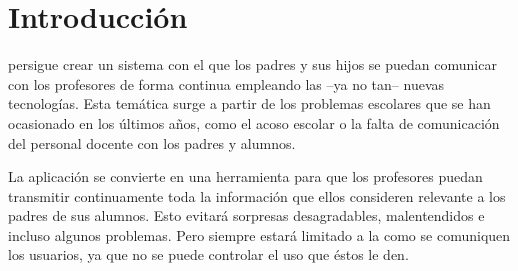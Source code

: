 %
%
%
%

\cleardoublepage
\chapter{Introducción}
\label{chap:intorduction}

\CollegeApp persigue crear un sistema con el que los padres y sus hijos se puedan comunicar con los profesores de forma continua empleando las --ya no tan-- nuevas tecnologías. Esta temática surge a partir de los problemas escolares que se han ocasionado en los últimos años, como el acoso escolar o la falta de comunicación del personal docente con los padres y alumnos.

\bigskip
La aplicación se convierte en una herramienta para que los profesores puedan transmitir continuamente toda la información que ellos consideren relevante a los padres de sus alumnos. Esto evitará sorpresas desagradables, malentendidos e incluso algunos problemas.
Pero siempre estará limitado a la como se comuniquen los usuarios, ya que no se puede controlar el uso que éstos le den.


